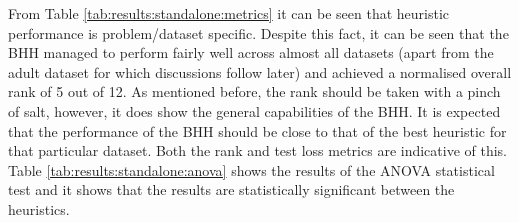 \begin{table}[htbp]
{\begin{tabular}{rcccccccccccc}
            \end{tabular}%
      }
\end{table}%

From Table \ref{tab:results:standalone:metrics} it can be seen that heuristic performance is problem/dataset specific. Despite this fact, it can be seen that the \Ac{BHH} managed to perform fairly well across almost all datasets (apart from the adult dataset for which discussions follow later) and achieved a normalised overall rank of 5 out of 12. As mentioned before, the rank should be taken with a pinch of salt, however, it does show the general capabilities of the \Ac{BHH}. It is expected that the performance of the \Ac{BHH} should be close to that of the best heuristic for that particular dataset. Both the rank and test loss metrics are indicative of this. Table \ref{tab:results:standalone:anova} shows the results of the ANOVA statistical test and it shows that the results are statistically significant between the heuristics.


\begin{table}[htbp]
      \centering
      \caption{ANOVA - Rank - Standalone vs BHH Baseline}
      \label{tab:results:standalone:anova}%
      \par\bigskip
\end{table}


